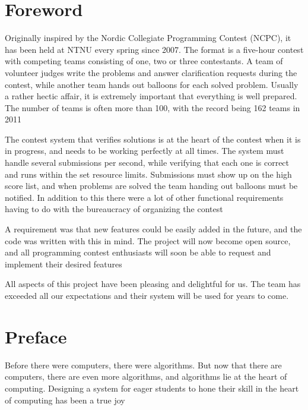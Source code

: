 \section*{Foreword}
Originally inspired by the Nordic Collegiate Programming Contest (NCPC),
it has been held at NTNU every spring since 2007. The format is a
five-hour contest with competing teams consisting of one, two or three
contestants. A team of volunteer judges write the problems and answer
clarification requests during the contest, while another team hands out
balloons for each solved problem. Usually a rather hectic affair, it is
extremely important that everything is well prepared. The number of
teams is often more than 100, with the record being 162 teams in 2011

The contest system that verifies solutions is at the heart of the
contest when it is in progress, and needs to be working perfectly at
all times. The system must handle several submissions per second, while
verifying that each one is correct and runs within the set resource
limits. Submissions must show up on the high score list, and when
problems are solved the team handing out balloons must be notified. In
addition to this there were a lot of other functional requirements
having to do with the bureaucracy of organizing the contest


\bigskip


A requirement was that new features could be easily added in the future,
and the code was written with this in mind. The project will now become
open source, and all programming contest enthusiasts will soon be able
to request and implement their desired features


\bigskip


All aspects of this project have been pleasing and delightful for us.
The team has exceeded all our expectations and their system will be
used for years to come.

\pagebreak

\section*{Preface}


Before there were computers, there were algorithms. But now that there
are computers, there are even more algorithms, and algorithms lie at
the heart of computing. Designing a system for eager students to hone
their skill in the heart of computing
has been a true joy


\bigskip


